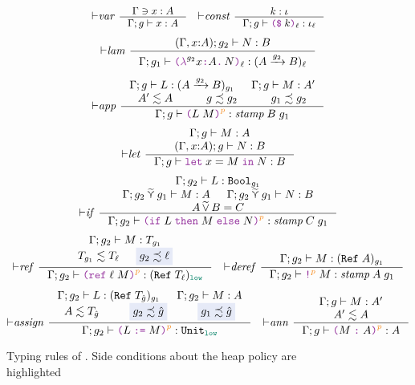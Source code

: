 \begin{figure}[tbp]
\raggedright
  \begin{gather*}
  \small
    {\vdash}\mathit{var}~
    \inference{\Gamma \ni x : A}
              {\Gamma; g \vdash x : A}
    \quad
    {\vdash}\mathit{const}~
    \inference{k : \iota}
              {\Gamma; g \vdash \const{k}{\ell} : \iota_\ell}
    \\[1ex]
    {\vdash}\mathit{lam}~
    \inference{(\Gamma , x{:}A); g_2 \vdash N : B}
              {\Gamma; g_1 \vdash \lam{g_2}{x}{A}{N}{\ell} : (\Fun{A}{g_2}{B})_\ell}
    \\[1ex]
    {\vdash}\mathit{app}~
    \inference{\Gamma; g \vdash L : (\Fun{A}{g_2}{B})_{g_1} &
               \Gamma; g \vdash M : A' \\
               A' \lesssim A & g \precsim g_2 & g_1 \precsim g_2}
              {\Gamma; g \vdash \app{L}{M}{p} : \textit{stamp}\;B\;g_1}
    \\[1ex]
    {\vdash}\mathit{let}~
    \inference{\Gamma; g \vdash M : A \\
               (\Gamma , x{:}A) ; g \vdash N : B}
              {\Gamma; g \vdash \letexp{x}{M}{N} : B}
    \\[1ex]
    {\vdash}\mathit{if}~
    \inference{\Gamma; g_2 \vdash L : \Bool_{g_1} \\
               \Gamma; g_2 \lconsisjoin g_1 \vdash M : A &
               \Gamma; g_2 \lconsisjoin g_1 \vdash N : B \\
               A \consisjoin B = C}
              {\Gamma; g_2 \vdash \ifexp{L}{M}{N}{p} : \textit{stamp}\;C\;g_1}
    \\[1ex]
    {\vdash}\mathit{ref}~
    \inference{\Gamma; g_2 \vdash M : T_{g_1} \\
               T_{g_1} \lesssim T_\ell & \highlightblue{g_2 \precsim \ell}}
              {\Gamma; g_2 \vdash \refexp{\ell}{M}{p} : (\Refer{T_\ell})_{\low}}
    \quad
    {\vdash}\mathit{deref}~
    \inference{\Gamma; g_2 \vdash M : (\Refer{A})_{g_1}}
              {\Gamma; g_2 \vdash \deref{M}{p} : \textit{stamp}\;A\;g_1}
    \\[1ex]
    {\vdash}\mathit{assign}~
    \inference{\Gamma; g_2 \vdash L : (\Refer{T_{\hat{g}}})_{g_1} &
               \Gamma; g_2 \vdash M : A \\
               A \lesssim T_{\hat{g}} & \highlightblue{g_2 \precsim \hat{g}} & \highlightblue{g_1 \precsim \hat{g}}}
              {\Gamma; g_2 \vdash \assign{L}{M}{p} : \Unit_{\low}}
    \quad
    {\vdash}\mathit{ann}~
    \inference{\Gamma; g \vdash M : A' \\ A' \lesssim A}
              {\Gamma; g \vdash \ann{M}{A}{p} : A}
  \end{gather*}
  \caption{Typing rules of \Surface. Side conditions about the heap policy are
    highlighted}
  \label{fig:surface-typing-full}
\end{figure}

